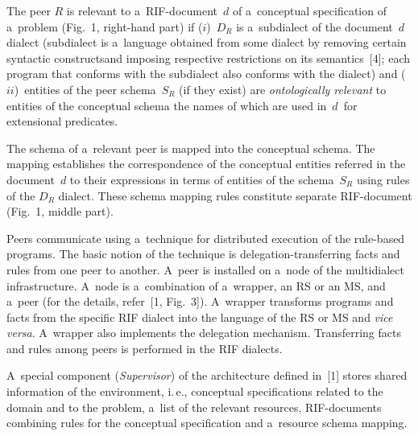 \begin{multicols}{2}
  The peer $R$ is relevant to a~RIF-document~$d$ of a~conceptual specification of a~problem
  (Fig.~1, right-hand part) if ($i$)~$D_R$ is a~subdialect of the document~$d$
dialect (subdialect is a~language obtained from some dialect by removing certain
syntactic constructsand imposing respective restrictions on its semantics~[4]; each
program that conforms with the subdialect also conforms with the dialect) and
($ii$)~entities of the peer schema~$S_R$ (if they exist) are \textit{ontologically
relevant} to entities of the conceptual schema the names of which are used
in~$d$~for extensional predicates.

  The schema of a~relevant peer is mapped into the conceptual schema. The mapping
establishes the correspondence of the conceptual entities referred in the
document~$d$ to their expressions in terms of entities of the schema~$S_R$ using
rules of the $D_R$ dialect. These schema mapping rules constitute separate
  RIF-document (Fig.~1, middle part).

  Peers communicate using a~technique for distributed execution of the rule-based
programs. The basic notion of the technique is delegation-transferring facts and
rules from one peer to another. A~peer is installed on a~node of the multidialect
infrastructure. A~node is a~combination of a~wrapper, an RS or an MS, and a~peer
(for the details, refer~[1, Fig.~3]). A~wrapper
transforms programs and facts from the specific RIF dialect into the language of the
RS or MS and \textit{vice versa}. A~wrapper also implements the delegation mechanism.
Transferring facts and rules among peers is performed in the RIF dialects.

  A~special component (\textit{Supervisor}) of the architecture defined in~[1] stores
shared information of the environment, i.\,e., conceptual specifications related to the
domain and to the problem, a~list of the relevant resources, RIF-documents combining
rules for the conceptual specification and a~resource schema mapping.


\end{multicols}
